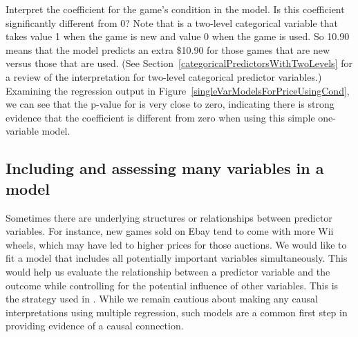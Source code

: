 \begin{example}{Interpret the coefficient for the game's condition in the model. Is this coefficient significantly different from 0?}
Note that  is a two-level categorical variable that takes value 1 when the game is new and value 0 when the game is used. So 10.90 means that the model predicts an extra \$10.90 for those games that are new versus those that are used. (See Section~\ref{categoricalPredictorsWithTwoLevels} for a review of the interpretation for two-level categorical predictor variables.) Examining the regression output in Figure~\ref{singleVarModelsForPriceUsingCond}, we can see that the p-value for  is very close to zero, indicating there is strong evidence that the coefficient is different from zero when using this simple one-variable model.
\end{example}

\subsection{Including and assessing many variables in a model}
\label{includingAndAssessingManyVariablesInAModel}

Sometimes there are underlying structures or relationships between predictor variables. For instance, new games sold on Ebay tend to come with more Wii wheels, which may have led to higher prices for those auctions. We would like to fit a model that includes all potentially important variables simultaneously. This would help us evaluate the relationship between a predictor variable and the outcome while controlling for the potential influence of other variables. This is the strategy used in . While we remain cautious about making any causal interpretations using multiple regression, such models are a common first step in providing evidence of a causal connection.

